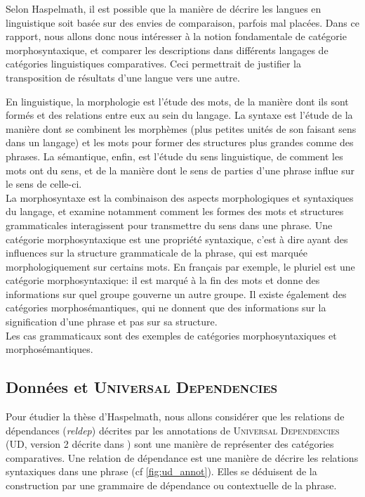 \documentclass{cours}
\begin{document}
Selon Haspelmath, il est possible que la manière de décrire les langues en linguistique soit basée sur des envies de comparaison, parfois mal placées.
Dans ce rapport, nous allons donc nous intéresser à la notion fondamentale de catégorie morphosyntaxique, et comparer les descriptions dans différents langages de catégories linguistiques comparatives.
Ceci permettrait de justifier la transposition de résultats d'une langue vers une autre.

\medskip
\label{subsec:linguistique}
En linguistique, la morphologie est l'étude des mots, de la manière dont ils sont formés et des relations entre eux au sein du langage.
La syntaxe est l'étude de la manière dont se combinent les morphèmes (plus petites unités de son faisant sens dans un langage) et les mots pour former des structures plus grandes comme des phrases.
La sémantique, enfin, est l'étude du sens linguistique, de comment les mots ont du sens, et de la manière dont le sens de parties d'une phrase influe sur le sens de celle-ci.\\
La morphosyntaxe est la combinaison des aspects morphologiques et syntaxiques du langage, et examine notamment comment les formes des mots et structures grammaticales interagissent pour transmettre du sens dans une phrase.
Une catégorie morphosyntaxique est une propriété syntaxique, c'est à dire ayant des influences sur la structure grammaticale de la phrase, qui est marquée morphologiquement sur certains mots.
En français par exemple, le pluriel est une catégorie morphosyntaxique: il est marqué à la fin des mots et donne des informations sur quel groupe gouverne un autre groupe.
Il existe également des catégories morphosémantiques, qui ne donnent que des informations sur la signification d'une phrase et pas sur sa structure.\\
\medskip
Les cas grammaticaux sont des exemples de catégories morphosyntaxiques et morphosémantiques.

\subsection{Données et \textsc{Universal Dependencies}}\label{subsec:données}
Pour étudier la thèse d'Haspelmath, nous allons considérer que les relations de dépendances (\textit{reldep}) décrites par les annotations de \textsc{Universal Dependencies} (UD, version 2 décrite dans \cite{UDv2}) sont une manière de représenter des catégories comparatives.
Une relation de dépendance est une manière de décrire les relations syntaxiques dans une phrase (cf \ref{fig:ud_annot}).
Elles se déduisent de la construction par une grammaire de dépendance ou contextuelle de la phrase.
\end{document}
